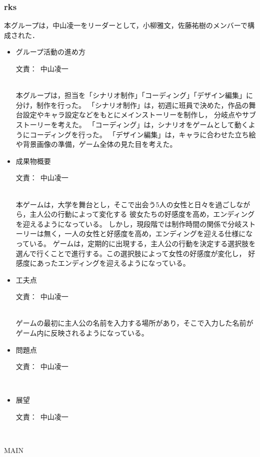 \documentclass[a4paper]{jarticle}
\newcommand{\resp}[1]{\begin{flushright}文責：~#1\end{flushright}~\\}
\begin{document}
\fi

\subsubsection{rks}
    
    本グループは，中山凌一をリーダーとして，小柳雅文，佐藤祐樹のメンバーで構成された．

    \begin{itemize}
        \item グループ活動の進め方
        
        \resp{中山凌一}

        本グループは，担当を「シナリオ制作」「コーディング」「デザイン編集」に分け，制作を行った。
        「シナリオ制作」は，初週に班員で決めた，作品の舞台設定やキャラ設定などをもとにメインストーリーを制作し，
        分岐点やサブストーリーを考えた。
        「コーディング」は，シナリオをゲームとして動くようにコーディングを行った。
        「デザイン編集」は，キャラに合わせた立ち絵や背景画像の準備，ゲーム全体の見た目を考えた。

        \item 成果物概要
        
        \resp{中山凌一}

        本ゲームは，大学を舞台とし，そこで出会う5人の女性と日々を過ごしながら，主人公の行動によって変化する
        彼女たちの好感度を高め，エンディングを迎えるようになっている。
        しかし，現段階では制作時間の関係で分岐ストーリーは無く，一人の女性と好感度を高め，エンディングを迎える仕様になっている。
        ゲームは，定期的に出現する，主人公の行動を決定する選択肢を選んで行くことで進行する。この選択肢によって女性の好感度が変化し，
        好感度にあったエンディングを迎えるようになっている。

        \item 工夫点
        
        \resp{中山凌一}

        ゲームの最初に主人公の名前を入力する場所があり，そこで入力した名前がゲーム内に反映されるようになっている。

        \item 問題点
        
        \resp{中山凌一}


        \item 展望
        
        \resp{中山凌一}


    \end{itemize}

\expandafter\ifx\csname MAIN \endcsname\relax
  
\end{document}
